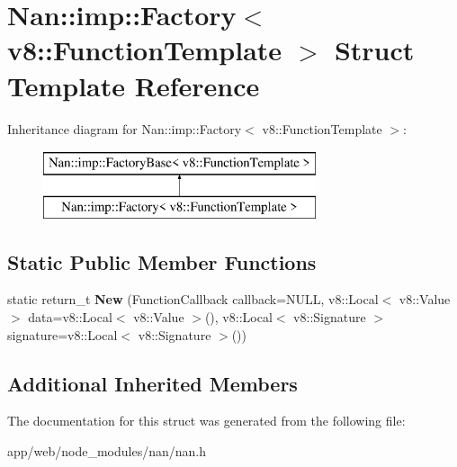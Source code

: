 \hypertarget{struct_nan_1_1imp_1_1_factory_3_01v8_1_1_function_template_01_4}{}\section{Nan\+:\+:imp\+:\+:Factory$<$ v8\+:\+:Function\+Template $>$ Struct Template Reference}
\label{struct_nan_1_1imp_1_1_factory_3_01v8_1_1_function_template_01_4}
Inheritance diagram for Nan\+:\+:imp\+:\+:Factory$<$ v8\+:\+:Function\+Template $>$\+:\begin{figure}[H]
\begin{center}
\leavevmode
\includegraphics[height=2.000000cm]{struct_nan_1_1imp_1_1_factory_3_01v8_1_1_function_template_01_4}
\end{center}
\end{figure}
\subsection*{Static Public Member Functions}
\begin{DoxyCompactItemize}
\item 
\mbox{\label{struct_nan_1_1imp_1_1_factory_3_01v8_1_1_function_template_01_4_a987d23d843b9eef975eb94cbbcad0532}} 
static return\+\_\+t {\bfseries New} (Function\+Callback callback=N\+U\+LL, v8\+::\+Local$<$ v8\+::\+Value $>$ data=v8\+::\+Local$<$ v8\+::\+Value $>$(), v8\+::\+Local$<$ v8\+::\+Signature $>$ signature=v8\+::\+Local$<$ v8\+::\+Signature $>$())
\end{DoxyCompactItemize}
\subsection*{Additional Inherited Members}


The documentation for this struct was generated from the following file\+:\begin{DoxyCompactItemize}
\item 
app/web/node\+\_\+modules/nan/nan.\+h\end{DoxyCompactItemize}

